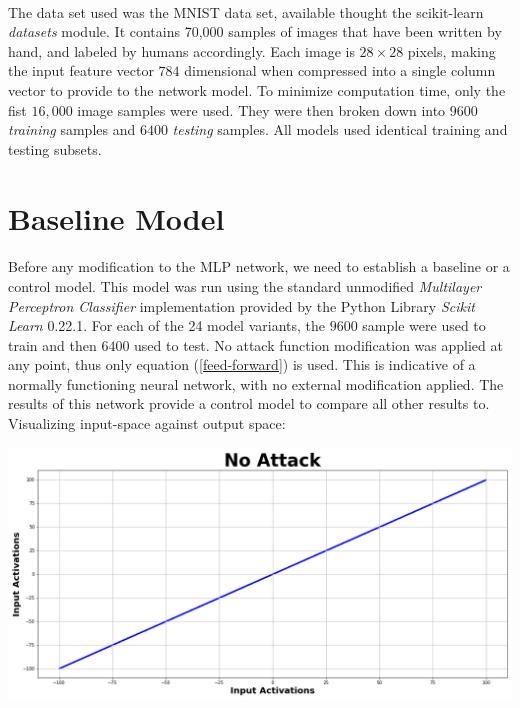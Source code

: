 \documentclass[12pt,letterpaper]{article}
\begin{document}
\paragraph*{}The data set used was the MNIST data set, available thought the scikit-learn \textit{datasets} module. It contains 70,000 samples of images that have been written by hand, and labeled by humans accordingly. Each image is $28 \times 28$ pixels, making the input feature vector $784$ dimensional when compressed into a single column vector to provide to the network model. To minimize computation time, only the fist $16,000$ image samples were used. They were then broken down into $9600$ \textit{training} samples and $6400$ \textit{testing} samples. All models used identical training and testing subsets.


\section*{Baseline Model}

\paragraph*{}Before any modification to the MLP network, we need to establish a baseline or a control model. This model was run using the standard unmodified \textit{Multilayer Perceptron Classifier} implementation provided by the Python Library \textit{Scikit Learn} 0.22.1. For each of the 24 model variants, the $9600$ sample were used to train and then $6400$ used to test. No attack function modification was applied at any point, thus only equation (\ref{feed-forward}) is used. This is indicative of a normally functioning neural network, with no external modification applied. The results of this network provide a control model to compare all other results to. Visualizing input-space against output space:
\begin{center}
\includegraphics[scale=0.3]{No_Attack}
\end{center}
\end{document}
